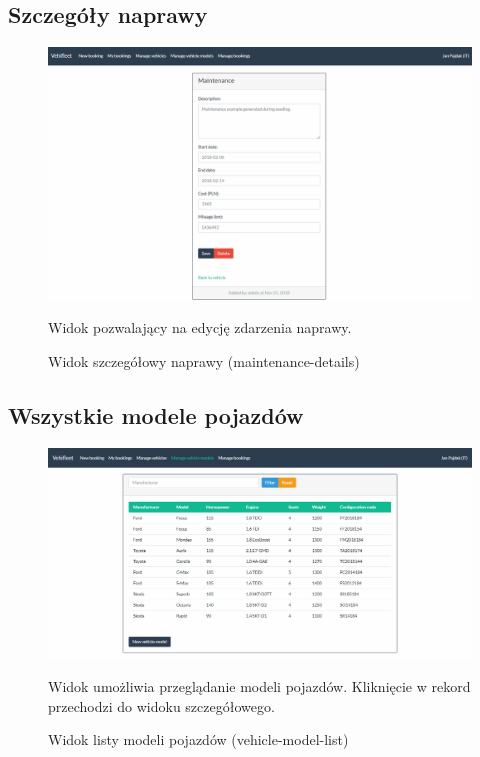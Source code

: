 \documentclass[eng,printmode,openany]{mgr}
\begin{document}
\subsection{Szczegóły naprawy}
\begin{figure}[H]
	\centering
	\includegraphics[width=\textwidth]{images/views/maintenance-detail.png}
	\caption{Widok szczegółowy naprawy (maintenance-details)}
	\small 
	Widok pozwalający na edycję zdarzenia naprawy.
\end{figure}

\subsection{Wszystkie modele pojazdów}
\begin{figure}[H]
	\centering
	\includegraphics[width=\textwidth]{images/views/vehicle-model-list.png}
	\caption{Widok listy modeli pojazdów (vehicle-model-list)}
	\small 
	Widok umożliwia przeglądanie modeli pojazdów. Kliknięcie w rekord przechodzi do widoku szczegółowego. 
\end{figure}
\end{document}
